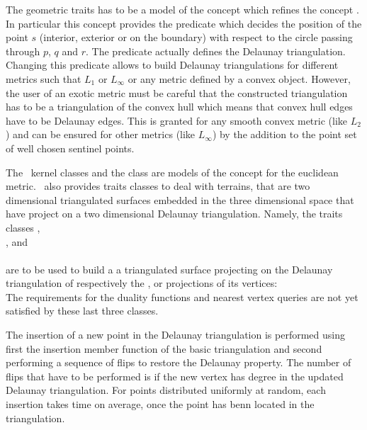 The geometric traits has to be a model of the concept
which refines the concept .
In particular this concept provides
the  predicate
which decides the position of  the point $s$ (interior, exterior
or on the boundary) with respect to the circle
passing through $p$, $q$ and $r$. 
The 
predicate actually defines the Delaunay triangulation.
Changing this predicate 
allows to build Delaunay triangulations for different metrics
such that $L_1$ or $L_{\infty}$ or any metric defined by a
convex object. However, the user of an exotic metric
must be careful that the constructed triangulation 
has to be a triangulation of the convex hull
which means that convex hull edges have to be Delaunay edges.
This is granted for any smooth convex metric (like $L_2$)
and can be ensured for other metrics (like  $L_{\infty}$)
by the addition to the point set of well chosen sentinel points.

The \cgal\  kernel classes 
 and the class 
are models of the concept 
for the euclidean metric.
\cgal\  also  provides traits classes to deal with terrains,
that are  two dimensional triangulated surfaces
embedded in the three  dimensional space that have project on 
a two dimensional  Delaunay triangulation. Namely, the traits classes
,\\
, and\\
 \\
are to be used to build a a triangulated surface
projecting on the Delaunay triangulation of respectively
the ,  or  projections of its vertices:\\
The requirements for the duality functions and nearest vertex
queries are not yet satisfied by
these last three classes.

The insertion of a new point in the Delaunay triangulation
is performed using first the insertion member function
of the basic triangulation and second 
performing a sequence of flips to restore the Delaunay property. 
The number of flips that have to be performed is 
if the new vertex has degree  in the updated
Delaunay triangulation. For
points distributed uniformly at random, 
each insertion takes time  on
average, once the point has benn located in the triangulation.

